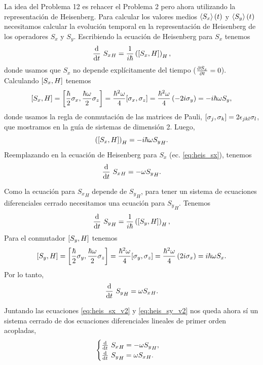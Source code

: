 \documentclass[10pt, a4paper]{article}
\numberwithin{equation}{subsection}
\begin{document}
La idea del Problema 12 es rehacer el Problema 2 pero ahora utilizando la
representación de Heisenberg. Para calcular los valores medios
$\expval{S_x}(t)$ y $\expval{S_y}(t)$ necesitamos calcular la evolución
temporal en la representación de Heisenberg de los operadores $S_x$ y $S_y$.
Escribiendo la ecuación de Heisenberg para $S_x$ tenemos
\begin{equation} \label{eq:heis_sx}
  \dv{t}\ {S_x}_H = \frac{1}{i\hbar}\left(\comm{S_x}{H}\right)_H,
\end{equation}
donde usamos que $S_x$ no depende explícitamente del tiempo ($\pdv{S_x}{t} =
0$). Calculando $\comm{S_x}{H}$ tenemos
\begin{equation}
  \comm{S_x}{H} = \comm{\frac{\hbar}{2}\sigma_x}{\frac{\hbar\omega}{2}\sigma_z}
    = \frac{\hbar^2\omega}{4}\comm{\sigma_x}{\sigma_z}
    = \frac{\hbar^2\omega}{4}\left(-2i\sigma_y\right)
    = -i\hbar\omega S_y,
\end{equation}
donde usamos la regla de conmutación de las matrices de Pauli,
$\comm{\sigma_j}{\sigma_k} = 2\epsilon_{jkl}\sigma_l$, que mostramos en la guía
de sistemas de dimensión 2. Luego,
\begin{equation}
  \left(\comm{S_x}{H}\right)_H = -i\hbar\omega{S_y}_H.
\end{equation}
Reemplazando en la ecuación de Heisenberg para $S_x$ (ec. \eqref{eq:heis_sx}),
tenemos
\begin{equation} \label{eq:heis_sx_v2}
  \dv{t}\ {S_x}_H = -\omega{S_y}_H.
\end{equation}

Como la ecuación para ${S_x}_H$ depende de ${S_y}_H$, para tener un sistema de
ecuaciones diferenciales cerrado necesitamos una ecuación para ${S_y}_H$.
Tenemos
\begin{equation} \label{eq:heis_sy}
  \dv{t}\ {S_y}_H = \frac{1}{i\hbar}\left(\comm{S_y}{H}\right)_H,
\end{equation}
Para el conmutador $\comm{S_y}{H}$ tenemos
\begin{equation}
  \comm{S_y}{H} = \comm{\frac{\hbar}{2}\sigma_y}{\frac{\hbar\omega}{2}\sigma_z}
    = \frac{\hbar^2\omega}{4}\comm{\sigma_y}{\sigma_z}
    = \frac{\hbar^2\omega}{4}\left(2i\sigma_x\right)
    = i\hbar\omega S_x.
\end{equation}
Por lo tanto,
\begin{equation} \label{eq:heis_sy_v2}
  \dv{t}\ {S_y}_H = \omega{S_x}_H.
\end{equation}

Juntando las ecuaciones \eqref{eq:heis_sx_v2} y \eqref{eq:heis_sy_v2} nos queda
ahora sí un sistema cerrado de dos ecuaciones diferenciales lineales de primer
orden acopladas,
\begin{equation}
  \begin{cases}
    \dv{t}\ {S_x}_H = -\omega{S_y}_H, \\
    \dv{t}\ {S_y}_H = \omega{S_x}_H.
  \end{cases}
\end{equation}
\end{document}
